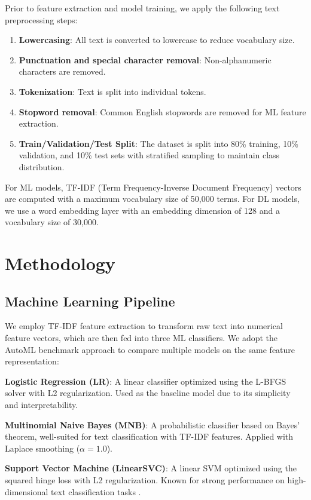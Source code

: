 \documentclass{article}
\begin{document}
Prior to feature extraction and model training, we apply the following text preprocessing steps:
\begin{enumerate}
\item \textbf{Lowercasing}: All text is converted to lowercase to reduce vocabulary size.
\item \textbf{Punctuation and special character removal}: Non-alphanumeric characters are removed.
\item \textbf{Tokenization}: Text is split into individual tokens.
\item \textbf{Stopword removal}: Common English stopwords are removed for ML feature extraction.
\item \textbf{Train/Validation/Test Split}: The dataset is split into 80\% training, 10\% validation, and 10\% test sets with stratified sampling to maintain class distribution.
\end{enumerate}

For ML models, TF-IDF (Term Frequency-Inverse Document Frequency) vectors are computed with a maximum vocabulary size of 50,000 terms. For DL models, we use a word embedding layer with an embedding dimension of 128 and a vocabulary size of 30,000.

\section{Methodology}

\subsection{Machine Learning Pipeline}

We employ TF-IDF feature extraction to transform raw text into numerical feature vectors, which are then fed into three ML classifiers. We adopt the AutoML benchmark approach to compare multiple models on the same feature representation:

\textbf{Logistic Regression (LR)}: A linear classifier optimized using the L-BFGS solver with L2 regularization. Used as the baseline model due to its simplicity and interpretability.

\textbf{Multinomial Naive Bayes (MNB)}: A probabilistic classifier based on Bayes' theorem, well-suited for text classification with TF-IDF features. Applied with Laplace smoothing ($\alpha = 1.0$).

\textbf{Support Vector Machine (LinearSVC)}: A linear SVM optimized using the squared hinge loss with L2 regularization. Known for strong performance on high-dimensional text classification tasks \cite{joachims1998text}.
\end{document}
